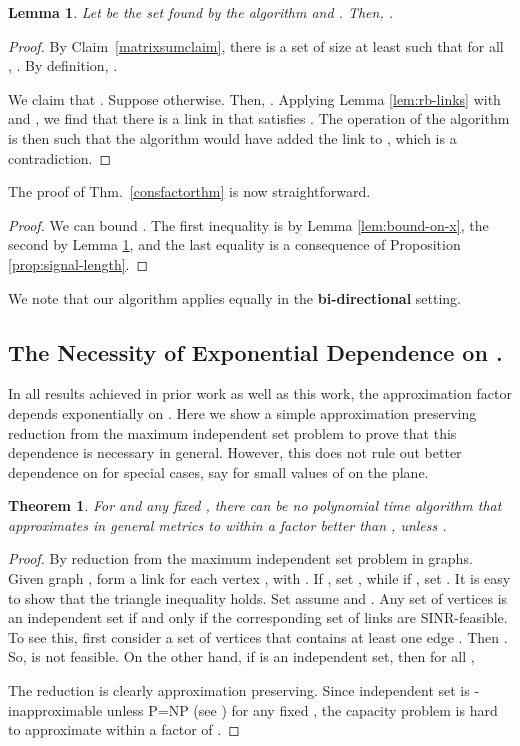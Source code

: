 \documentclass[11pt]{amsart}
\newcounter{foo}
\newtheorem{theorem}[foo]{Theorem}
\newtheorem{lemma}[foo]{Lemma}
\begin{document}
\begin{lemma}
Let  be the set found by the algorithm and .
Then, .
\label{lem:rb-applic}
\end{lemma}
\begin{proof}
By Claim~\ref{matrixsumclaim}, there is a set  of size at least  such that for all , . By definition, .

We claim that .
Suppose otherwise. Then, .
Applying Lemma \ref{lem:rb-links} with  and , we find that there is a link  in  that satisfies 
. 
The operation of the algorithm is then such that the algorithm would
have added the link  to , which is a contradiction.
\end{proof}

The proof of Thm.~\ref{consfactorthm} is now straightforward.
\begin{proof}
We can bound . 
The first inequality is by Lemma \ref{lem:bound-on-x}, the second by 
Lemma \ref{lem:rb-applic}, and the last equality is a consequence of Proposition
\ref{prop:signal-length}.
\end{proof}



We note that our algorithm applies equally in the {\bf bi-directional} setting.

\subsection{The Necessity of Exponential Dependence on .}
In all results achieved in prior work as well as this work, the
approximation factor depends exponentially on . Here we show a
simple approximation preserving reduction from the maximum independent
set problem to prove that this dependence is necessary in
general. However, this does not rule out better dependence on 
for special cases, say for small values of  on the
plane.

\begin{theorem}
\label{pathlossnecessary}
For  and any fixed , there can be no polynomial time algorithm that approximates 
\calU in general metrics to within a factor better than
 , unless . 
\end{theorem}
\begin{proof}
By reduction from the maximum independent set problem in graphs.
Given graph , form a link  for each vertex ,
with .
If , set , while if , set . It is easy to show that the triangle inequality holds.  Set
assume  and .  Any
set of vertices  is an independent set if and only if
the corresponding set of links are SINR-feasible. To see this, first consider
a set of vertices that contains at least one edge . Then
. So,  is not feasible.
On the other hand, if  is an independent set, then for all ,

\iffalse

\fi
The reduction is clearly approximation preserving.  Since independent
set is -inapproximable unless P=NP (see
\cite{Zuckerman06}) for any fixed , the capacity problem
is hard to approximate within a factor of .
\end{proof}
\end{document}
